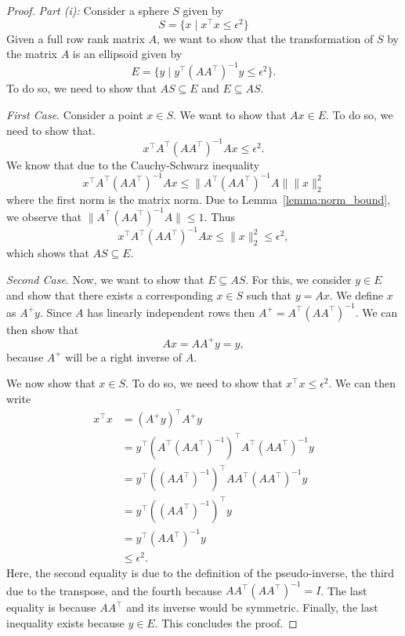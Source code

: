 \documentclass[10pt,a4paper]{amsart}
\begin{document}
\begin{proof}
	\emph{Part (i):}
	Consider a sphere \(S\) given by 
	\[
	S = \{x \mid x^{\top}x \leq \epsilon^2\}	
	\]
	Given a full row rank matrix \(A\), we want to show that the transformation of \(S\) by the matrix \(A\) is an ellipsoid given by 
	\[
	E = \{y \mid y^{\top}(A A^{\top})^{-1}y \leq \epsilon^2\}.	
	\]
	To do so, we need to show that \(A S \subseteq E\) and \(E \subseteq A S\). 

	\emph{First Case}.
	Consider a point \(x \in S\). We want to show that \(A x \in E\).
	To do so, we need to show that. 
	\[
	x^{\top}A^{\top}(A A^{\top})^{-1}A x \leq \epsilon^2.	
	\]
	We know that due to the Cauchy-Schwarz inequality 
	\[
		x^{\top}A^{\top}(A A^{\top})^{-1}A x \leq \|A^{\top}(A A^{\top})^{-1}A\| \|x\|_2^2	
	\]
	where the first norm is the matrix norm.
	Due to Lemma~\ref{lemma:norm_bound}, we observe that \(\|A^{\top}(A A^{\top})^{-1}A\| \leq 1\). 
	Thus
	\[
		x^{\top}A^{\top}(A A^{\top})^{-1}A x \leq \|x\|_2^2	\leq \epsilon^2,
	\]
	which shows that \(A S \subseteq E\). 
	
	\emph{Second Case}.
	Now, we want to show that \(E \subseteq A S\). For this, we consider \(y \in E\) and show that there exists a corresponding \(x \in S\) such that \(y = Ax\).
	We define \(x\) as \(A^{+}y\). Since \(A\) has linearly independent rows then \(A^{+} = A^{\top}(A A^{\top})^{-1}\).
	We can then show that 
	\[
	A x = A A^{+} y = y, 	
	\]
	because \(A^{+}\) will be a right inverse of \(A\). 

	We now show that \(x \in S\). 
	To do so, we need to show that \(x^{\top}x \leq \epsilon^2\).
	We can then write 
	\begin{align*}
		x^{\top}x &= (A^{+}y)^{\top}A^{+} y \\
		&= y^{\top}(A^{\top}(A A^{\top})^{-1})^{\top}A^{\top}(A A^{\top})^{-1} y\\
		&= y^{\top}((A A^{\top})^{-1})^{\top}A A^{\top}(A A^{\top})^{-1} y\\
		&= y^{\top}((A A^{\top})^{-1})^{\top} y\\
		&= y^{\top}(A A^{\top})^{-1} y\\
		&\leq \epsilon^2.
	\end{align*}
	Here, the second equality is due to the definition of the pseudo-inverse, the third due to the transpose, and the fourth because \(AA^{\top}(AA^{\top})^{-1} = I\). 
	The last equality is because \(A A^{\top}\) and its inverse would be symmetric. 
	Finally, the last inequality exists because \(y \in E\). 
	This concludes the proof. 


\end{proof}
\end{document}
